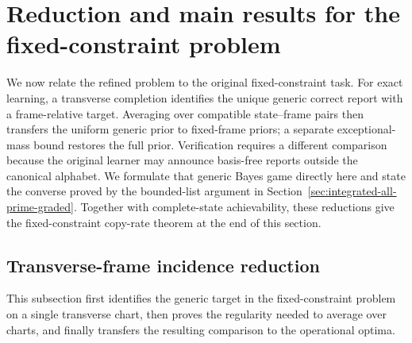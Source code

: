 \documentclass[11pt]{article}
\newcommand{\1}{\mathbf 1}
\theoremstyle{plain}
\theoremstyle{definition}
\theoremstyle{remark}
\begin{document}
\section{Reduction and main results for the fixed-constraint problem}
\label{sec:generic-fixed-W-frame-relation}
We now relate the refined problem to the original fixed-constraint task.
For exact learning, a transverse completion identifies the unique generic
correct report with a frame-relative target.  Averaging over compatible
state--frame pairs then transfers the uniform generic prior to fixed-frame
priors; a separate exceptional-mass bound restores the full prior.  Verification
requires a different comparison because the original learner may announce
basis-free reports outside the canonical alphabet.  We formulate that generic
Bayes game directly here and state the converse proved by the bounded-list
argument in Section~\ref{sec:integrated-all-prime-graded}.  Together with
complete-state achievability, these reductions give the fixed-constraint
copy-rate theorem at the end of this section.

\subsection{Transverse-frame incidence reduction}
\label{subsec:fixed-W-frame-refinement}

This subsection first identifies the generic target in the fixed-constraint
problem on a single transverse chart, then proves the regularity needed to average over charts,
 and finally transfers the resulting comparison to the operational optima.
\end{document}
